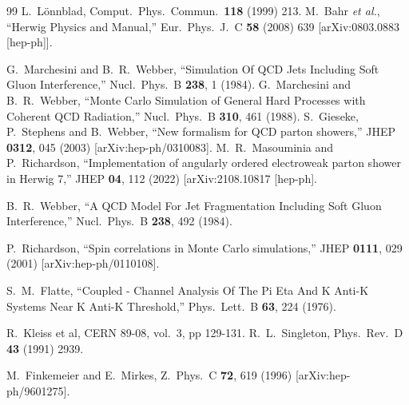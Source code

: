 \documentclass{article}
\begin{document}
\begin{thebibliography}{99}
 L.~L\"onnblad, Comput.~Phys.~Commun.\ {\bf 118} (1999) 213.
  M.~Bahr {\it et al.},
  ``Herwig Physics and Manual,''
  Eur.\ Phys.\ J.\  C {\bf 58} (2008) 639
  [arXiv:0803.0883 [hep-ph]].

  G.~Marchesini and B.~R.~Webber,
  ``Simulation Of QCD Jets Including Soft Gluon Interference,''
  Nucl.\ Phys.\  B {\bf 238}, 1 (1984).
  G.~Marchesini and B.~R.~Webber,
   ``Monte Carlo Simulation of General Hard Processes with Coherent QCD
  Radiation,''
  Nucl.\ Phys.\  B {\bf 310}, 461 (1988).
  S.~Gieseke, P.~Stephens and B.~Webber,
  ``New formalism for QCD parton showers,''
  JHEP {\bf 0312}, 045 (2003)
  [arXiv:hep-ph/0310083].
  M.~R.~Masouminia and P.~Richardson,
  ``Implementation of angularly ordered electroweak parton shower in Herwig 7,''
  JHEP {\bf 04}, 112 (2022)
  [arXiv:2108.10817 [hep-ph].

  B.~R.~Webber,
  ``A QCD Model For Jet Fragmentation Including Soft Gluon Interference,''
  Nucl.\ Phys.\  B {\bf 238}, 492 (1984).

  P.~Richardson,
  ``Spin correlations in Monte Carlo simulations,''
  JHEP {\bf 0111}, 029 (2001)
  [arXiv:hep-ph/0110108].

  S.~M.~Flatte,
   ``Coupled - Channel Analysis Of The Pi Eta And K Anti-K Systems Near K Anti-K
  Threshold,''
  Phys.\ Lett.\  B {\bf 63}, 224 (1976).

 R.~Kleiss et al, CERN 89-08, vol.~3, pp 129-131.
  R.~L.~Singleton,
  Phys.\ Rev.\  D {\bf 43} (1991) 2939.

  M.~Finkemeier and E.~Mirkes,
  Z.\ Phys.\  C {\bf 72}, 619 (1996)
  [arXiv:hep-ph/9601275].


\end{thebibliography}
\end{document}
